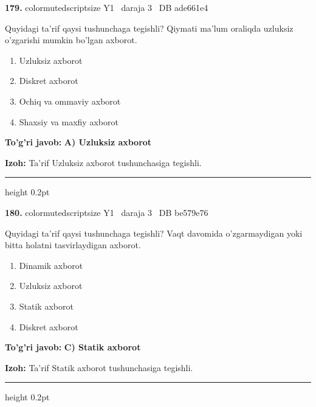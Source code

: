 \documentclass[10pt,a4paper,oneside]{article}
\begin{document}
\noindent\textbf{\color{ink}179.}  {color{muted}scriptsize Y1 \textbullet\ daraja 3 \textbullet\ DB ade661e4}
\par
Quyidagi ta'rif qaysi tushunchaga tegishli? Qiymati ma'lum oraliqda uzluksiz o'zgarishi mumkin bo'lgan axborot.
\begin{enumerate}[label=\Alph*),leftmargin=9mm]
\item Uzluksiz axborot
\item Diskret axborot
\item Ochiq va ommaviy axborot
\item Shaxsiy va maxfiy axborot
\end{enumerate}
\begin{tcolorbox}[enhanced,breakable,colback=teal!4,colframe=teal!50!black,boxrule=0.5pt,arc=1.1mm,left=3mm,right=3mm,top=1.7mm,bottom=1.7mm,before skip=2mm,after skip=2mm]
\textbf{\color{teal}To'g'ri javob:} \textbf{A) Uzluksiz axborot}
\par\smallskip
\textbf{Izoh:} Ta'rif Uzluksiz axborot tushunchasiga tegishli.
\end{tcolorbox}
\vspace{2mm}\hrule height 0.2pt \vspace{3mm}

\noindent\textbf{\color{ink}180.}  {color{muted}scriptsize Y1 \textbullet\ daraja 3 \textbullet\ DB be579e76}
\par
Quyidagi ta'rif qaysi tushunchaga tegishli? Vaqt davomida o'zgarmaydigan yoki bitta holatni tasvirlaydigan axborot.
\begin{enumerate}[label=\Alph*),leftmargin=9mm]
\item Dinamik axborot
\item Uzluksiz axborot
\item Statik axborot
\item Diskret axborot
\end{enumerate}
\begin{tcolorbox}[enhanced,breakable,colback=teal!4,colframe=teal!50!black,boxrule=0.5pt,arc=1.1mm,left=3mm,right=3mm,top=1.7mm,bottom=1.7mm,before skip=2mm,after skip=2mm]
\textbf{\color{teal}To'g'ri javob:} \textbf{C) Statik axborot}
\par\smallskip
\textbf{Izoh:} Ta'rif Statik axborot tushunchasiga tegishli.
\end{tcolorbox}
\vspace{2mm}\hrule height 0.2pt \vspace{3mm}
\end{document}
